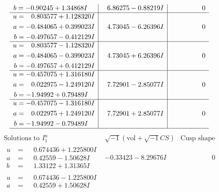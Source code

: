 \documentclass[1p]{elsarticle_modified}
\theoremstyle{definition}
\newcommand{\I}{\sqrt{-1}}
\begin{document}
$$\begin{array}{c|c|c}
\begin{aligned}
b &= -0.90245 + 1.34868 I\end{aligned}
 & \phantom{-}6.86275 - 0.88219 I & \phantom{-0.000000 } 0 \\ \hline\begin{aligned}
u &= \phantom{-}0.803577 + 1.128320 I \\
a &= -0.484065 + 0.399023 I \\
b &= -0.497657 - 0.412129 I\end{aligned}
 & \phantom{-}4.73045 - 6.26396 I & \phantom{-0.000000 } 0 \\ \hline\begin{aligned}
u &= \phantom{-}0.803577 - 1.128320 I \\
a &= -0.484065 - 0.399023 I \\
b &= -0.497657 + 0.412129 I\end{aligned}
 & \phantom{-}4.73045 + 6.26396 I & \phantom{-0.000000 } 0 \\ \hline\begin{aligned}
u &= -0.457075 + 1.316180 I \\
a &= \phantom{-}0.022975 - 1.249120 I \\
b &= -1.94992 + 0.79489 I\end{aligned}
 & \phantom{-}7.72901 - 2.85077 I & \phantom{-0.000000 } 0 \\ \hline\begin{aligned}
u &= -0.457075 - 1.316180 I \\
a &= \phantom{-}0.022975 + 1.249120 I \\
b &= -1.94992 - 0.79489 I\end{aligned}
 & \phantom{-}7.72901 + 2.85077 I & \phantom{-0.000000 } 0\\
 \hline 
 \end{array}$$\newpage$$\begin{array}{c|c|c}  
\text{Solutions to }I^u_{1}& \I (\text{vol} + \sqrt{-1}CS) & \text{Cusp shape}\\
 \hline 
\begin{aligned}
u &= \phantom{-}0.674436 + 1.225800 I \\
a &= \phantom{-}0.42559 - 1.50628 I \\
b &= \phantom{-}1.33122 + 1.31365 I\end{aligned}
 & -0.33423 - 8.29676 I & \phantom{-0.000000 } 0 \\ \hline\begin{aligned}
u &= \phantom{-}0.674436 - 1.225800 I \\
a &= \phantom{-}0.42559 + 1.50628 I \\

\end{aligned}
\end{array}$$
\end{document}
